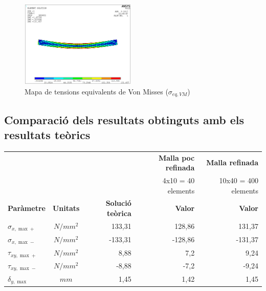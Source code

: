 \documentclass[a4paper]{article}
\def\imgS{0.49\textwidth}
\begin{document}
\begin{figure}[H]
	\centering
	\includegraphics[width=\imgS]{images/400_von_misses}
	\caption{Mapa de tensions equivalents de Von Misses ($\sigma_{eq,VM}$)}
	\label{fig:400_von_misses}
\end{figure}

\subsection{Comparació dels resultats obtinguts amb els resultats teòrics}

\begin{table}[H]
	\centering
	\begin{tabular}{|l|c|r|r|r|}
		\cline{4-5}
		\multicolumn{3}{c|}{\multirow{2}{*}{}} & \textbf{Malla poc refinada} & \textbf{Malla refinada} \\
		\multicolumn{3}{c|}{} & 4x10 = 40 elements & 10x40 = 400 elements \\
		\hline
		\textbf{Paràmetre} & \textbf{Unitats} & \textbf{Solució teòrica} & \textbf{Valor} & \textbf{Valor} \\
		\hline
		$\sigma_{x,\max+}$ & $N/mm^2$ & 133,31 & 128,86 & 131,37 \\
		$\sigma_{x,\max-}$ & $N/mm^2$ & -133,31 & -128,86 & -131,37 \\
		$\tau_{xy,\max+}$ & $N/mm^2$ & 8,88 & 7,2 & 9,24 \\
		$\tau_{xy,\max-}$ & $N/mm^2$ & -8,88 & -7,2 & -9,24 \\
		$\delta_{y,\max}$ & $mm$ & 1,45 & 1,42 & 1,45 \\
		\hline
	\end{tabular}
\end{table}
\end{document}

